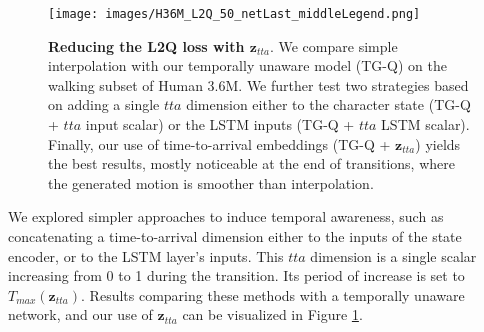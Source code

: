 \documentclass[acmtog]{acmart}
\newcommand{\bz}{\textbf{z}}
\begin{document}
\begin{figure}[h]
\begin{center}
\centerline{\texttt{[image: images/H36M\_L2Q\_50\_netLast\_middleLegend.png]}}
  \caption{\textbf{Reducing the L2Q loss with $\bz_{\mathit{tta}}$}. We compare simple interpolation with our temporally unaware model (TG-Q) on the walking subset of Human 3.6M. We further test two strategies based on adding a single $tta$ dimension either to the character state (TG-Q + $tta$ input scalar) or the LSTM inputs (TG-Q + $tta$ LSTM scalar). Finally, our use of time-to-arrival embeddings (TG-Q + $\bz_{\mathit{tta}}$) yields the best results, mostly noticeable at the end of transitions, where the generated motion is smoother than interpolation.}
  \label{fig:tta_effects}
\end{center}
\vspace{-0.5cm}
\end{figure}

We explored simpler approaches to induce temporal awareness, such as concatenating a time-to-arrival dimension either to the inputs of the state encoder, or to the LSTM layer's inputs. This $tta$ dimension is a single scalar increasing from 0 to 1 during the transition. Its period of increase is set to $T_{\mathit{max}}(\bz_{\mathit{tta}})$. Results comparing these methods with a temporally unaware network, and our use of $\bz_{\mathit{tta}}$ can be visualized in Figure \ref{fig:tta_effects}.
\end{document}
